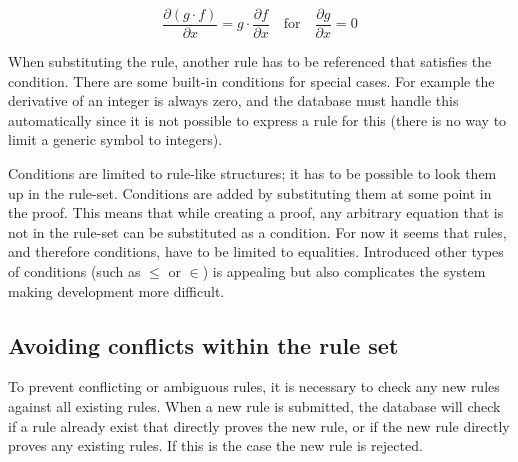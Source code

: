 \documentclass{article}
\begin{document}
\begin{equation} \frac{\partial (g\cdot f)}{\partial x}=g\cdot\frac{\partial f}{\partial x}
\quad\textrm{for}\quad
\frac{\partial g}{\partial x}=0
\end{equation}

When substituting the rule, another rule has to be referenced that satisfies the condition. There are some built-in conditions for special cases. For example the derivative of an integer is always zero, and the database must handle this automatically since it is not possible to express a rule for this (there is no way to limit a generic symbol to integers). \par
Conditions are limited to rule-like structures; it has to be possible to look them up in the rule-set. Conditions are added by substituting them at some point in the proof. This means that while creating a proof, any arbitrary equation that is not in the rule-set can be substituted as a condition. For now it seems that rules, and therefore conditions, have to be limited to equalities. Introduced other types of conditions (such as $\leq$ or $\in$) is appealing but also complicates the system making development more difficult.

\subsection{Avoiding conflicts within the rule set}
To prevent conflicting or ambiguous rules, it is necessary to check any new rules against all existing rules. When a new rule is submitted, the database will check if a rule already exist that directly proves the new rule, or if the new rule directly proves any existing rules. If this is the case the new rule is rejected.

\newpage
\end{document}
